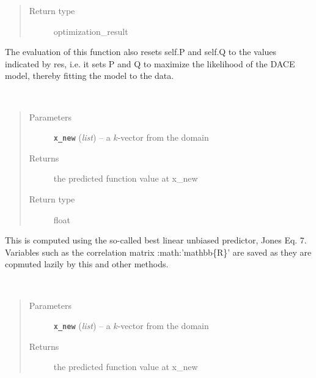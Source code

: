\documentclass[letterpaper,10pt,english]{sphinxmanual}
\begin{document}
\begin{fulllineitems}
\begin{fulllineitems}
\begin{quote}
\begin{description}
\item[{Return type}] \leavevmode
optimization\_result

\end{description}\end{quote}

The evaluation of this function also resets self.P and self.Q to the values indicated by res, i.e.
it sets P and Q to maximize the likelihood of the DACE model, thereby fitting the model to the data.

\end{fulllineitems}


\begin{fulllineitems}
\label{index:smbo.models.dace.pred_err}~\begin{quote}\begin{description}
\item[{Parameters}] \leavevmode
\textbf{\texttt{x\_new}} (\emph{list}) -- a \(k\)-vector from the domain

\item[{Returns}] \leavevmode
the predicted function value at x\_new

\item[{Return type}] \leavevmode
float

\end{description}\end{quote}

This is computed using the so-called best linear unbiased predictor,  Jones Eq. 7. Variables such as the correlation matrix :math:'mathbb\{R\}' are saved as they are copmuted lazily by this and other methods.

\end{fulllineitems}


\begin{fulllineitems}
\label{index:smbo.models.dace.predict}~\begin{quote}\begin{description}
\item[{Parameters}] \leavevmode
\textbf{\texttt{x\_new}} (\emph{list}) -- a \(k\)-vector from the domain

\item[{Returns}] \leavevmode
the predicted function value at x\_new


\end{description}
\end{quote}
\end{fulllineitems}
\end{fulllineitems}
\end{document}
